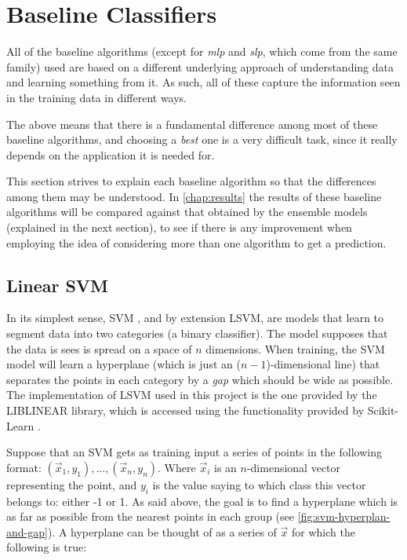 \documentclass[epsfig,a4paper,11pt,titlepage,twoside,openany]{book}
\begin{document}
\section{Baseline Classifiers}
\label{sec:baseline-classifiers}

All of the baseline algorithms (except for \textit{mlp} and \textit{slp}, which come from the same family) used are based on a different underlying approach of understanding data and learning something from it. As such, all of these capture the information seen in the training data in different ways. 

The above means that there is a fundamental difference among most of these baseline algorithms, and choosing a \textit{best} one is a very difficult task, since it really depends on the application it is needed for. 

This section strives to explain each baseline algorithm so that the differences among them may be understood. In \autoref{chap:results} the results of these baseline algorithms will be compared against that obtained by the ensemble models (explained in the next section), to see if there is any improvement when employing the idea of considering more than one algorithm to get a prediction. 


\subsection{Linear SVM}
\label{sec:clf-lsvm}

In its simplest sense, SVM \cite{Vapnik1995_svm, Cristianini2000_svm}, and by extension LSVM, are models that learn to segment data into two categories (a binary classifier). The model supposes that the data is sees is spread on a space of $n$ dimensions. When training, the SVM model will learn a hyperplane (which is just an ($n-1$)-dimensional line) that separates the points in each category by a \textit{gap} which should be wide as possible. The implementation of LSVM used in this project is the one provided by the LIBLINEAR \cite{Fan:2008_liblinear} library, which is accessed using the functionality provided by Scikit-Learn \cite{scikit-learn}. 

Suppose that an SVM gets as training input a series of points in the following format: $(\vec{x}_1, y_1), ..., (\vec{x}_n, y_n)$. Where $\vec{x}_i$ is an  $n$-dimensional vector representing the point, and $y_i$ is the value saying to which class this vector belongs to: either -1 or 1. As said above, the goal is to find a hyperplane which is as far as possible from the nearest points in each group (see \autoref{fig:svm-hyperplan-and-gap}). A hyperplane can be thought of as a series of $\vec{x}$ for which the following is true:
\end{document}
